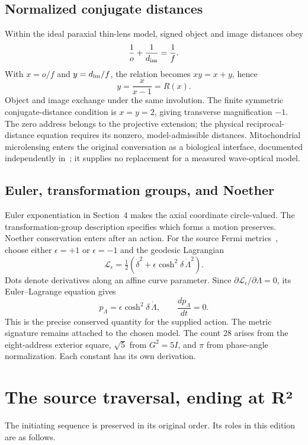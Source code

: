 \documentclass[11pt]{article}
\theoremstyle{definition}\newtheorem{definition}[theorem]{Definition}
\newcommand{\page}{\clearpage}
\begin{document}
\subsection{Normalized conjugate distances}
Within the ideal paraxial thin-lens model, signed object and image distances obey
\begin{equation}
 \frac1o+\frac1{d_{\rm im}}=\frac1f.
\end{equation}
With $x=o/f$ and $y=d_{\rm im}/f$, the relation becomes $xy=x+y$, hence
\begin{equation}
 y=\frac{x}{x-1}=R(x).
\end{equation}
Object and image exchange under the same involution. The finite symmetric conjugate-distance condition is $x=y=2$, giving transverse magnification $-1$. The zero address belongs to the projective extension; the physical reciprocal-distance equation requires its nonzero, model-admissible distances. Mitochondrial microlensing enters the original conversation as a biological interface, documented independently in~\cite{Ball}; it supplies no replacement for a measured wave-optical model.

\subsection{Euler, transformation groups, and Noether}
Euler exponentiation in Section~4 makes the axial coordinate circle-valued. The transformation-group description specifies which forms a motion preserves. Noether conservation enters after an action. For the source Fermi metrics~\cite{LI}, choose either $\epsilon=+1$ or $\epsilon=-1$ and the geodesic Lagrangian
\begin{equation}
 \mathcal L_\epsilon=\tfrac12\left(\dot\delta^2+\epsilon\cosh^2\delta\,\dot\Lambda^2\right).
\end{equation}
Dots denote derivatives along an affine curve parameter. Since $\partial\mathcal L_\epsilon/\partial\Lambda=0$, its Euler--Lagrange equation gives
\begin{equation}
 p_\Lambda=\epsilon\cosh^2\delta\,\dot\Lambda,\qquad
 \frac{d p_\Lambda}{dt}=0.
\end{equation}
This is the precise conserved quantity for the supplied action. The metric signature remains attached to the chosen model. The count 28 arises from the eight-address exterior square, $\sqrt5$ from $G^2=5I$, and $\pi$ from phase-angle normalization. Each constant has its own derivation.

\page
\appendix
\section{The source traversal, ending at R²}
The initiating sequence is preserved in its original order. Its roles in this edition are as follows.
\end{document}
